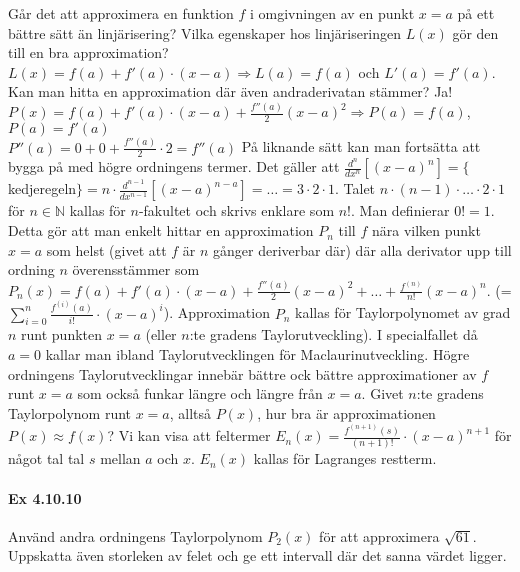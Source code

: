 Går det att approximera en funktion $f$ i omgivningen av en punkt $x=a$ på ett bättre sätt än linjärisering?
Vilka egenskaper hos linjäriseringen $L(x)$ gör den till en bra approximation?
$L(x)=f(a)+f'(a)\cdot(x-a)\Rightarrow L(a)=f(a)$ och $L'(a)=f'(a)$.
Kan man hitta en approximation där även andraderivatan stämmer? Ja!
$P(x)=f(a)+f'(a)\cdot(x-a)+\frac{f''(a)}{2}(x-a)^2\Rightarrow P(a)=f(a)$, $P(a)=f'(a)$\\
$P''(a)=0+0+\frac{f''(a)}{2}\cdot 2=f''(a)$
På liknande sätt kan man fortsätta att bygga på med högre ordningens termer.
Det gäller att $\frac{d^n}{dx^n}[(x-a)^n]=\{$kedjeregeln$\}=n\cdot\frac{d^{n-1}}{dx^{n-1}}[(x-a)^{n-a}]=\dots=3\cdot 2\cdot 1$.
Talet $n\cdot (n-1)\cdot\dots\cdot 2\cdot 1$ för $n\in\mathbb{N}$ kallas för $n$-fakultet och skrivs enklare som $n!$.
Man definierar $0!=1$.
Detta gör att man enkelt hittar en approximation $P_n$ till $f$ nära vilken punkt $x=a$ som helst (givet att $f$ är $n$ gånger deriverbar där)
där alla derivator upp till ordning $n$ överensstämmer som $P_n(x)=f(a)+f'(a)\cdot(x-a)+\frac{f''(a)}{2}(x-a)^2+\dots +\frac{f^{(n)}}{n!}(x-a)^n$.
(=$\sum^n_{i=0}\frac{f^{(i)}(a)}{i!}\cdot(x-a)^i$).
Approximation $P_n$ kallas för Taylorpolynomet av grad $n$ runt punkten $x=a$ (eller $n$:te gradens Taylorutveckling).
I specialfallet då $a=0$ kallar man ibland Taylorutvecklingen för Maclaurinutveckling.
Högre ordningens Taylorutvecklingar innebär bättre ock bättre approximationer av $f$ runt $x=a$ som också funkar längre och längre från $x=a$.
Givet $n$:te gradens Taylorpolynom runt $x=a$, alltså $P(x)$, hur bra är approximationen $P(x)\approx f(x)$?
Vi kan visa att feltermer $E_n(x)=\frac{f^{(n+1)}(s)}{(n+1)!}\cdot (x-a)^{n+1}$ för något tal tal $s$ mellan $a$ och $x$.
$E_n(x)$ kallas för Lagranges restterm.

\paragraph{Ex 4.10.10} Använd andra ordningens Taylorpolynom $P_2(x)$ för att approximera $\sqrt{61}$.
Uppskatta även storleken av felet och ge ett intervall där det sanna värdet ligger.\\
